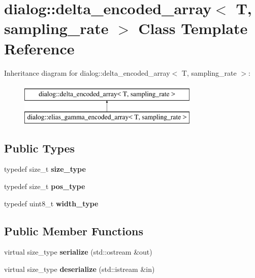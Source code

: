 \hypertarget{classdialog_1_1delta__encoded__array}{}\section{dialog\+:\+:delta\+\_\+encoded\+\_\+array$<$ T, sampling\+\_\+rate $>$ Class Template Reference}
\label{classdialog_1_1delta__encoded__array}
Inheritance diagram for dialog\+:\+:delta\+\_\+encoded\+\_\+array$<$ T, sampling\+\_\+rate $>$\+:\begin{figure}[H]
\begin{center}
\leavevmode
\includegraphics[height=2.000000cm]{classdialog_1_1delta__encoded__array}
\end{center}
\end{figure}
\subsection*{Public Types}
\begin{DoxyCompactItemize}
\item 
\mbox{\label{classdialog_1_1delta__encoded__array_a0cd3b42e267ec14eeb48f76bf3211c8f}} 
typedef size\+\_\+t {\bfseries size\+\_\+type}
\item 
\mbox{\label{classdialog_1_1delta__encoded__array_a9ed959d0d2070fa3044847cf4c3bbc12}} 
typedef size\+\_\+t {\bfseries pos\+\_\+type}
\item 
\mbox{\label{classdialog_1_1delta__encoded__array_aaa88ddf82d3790ea40350b14931c515e}} 
typedef uint8\+\_\+t {\bfseries width\+\_\+type}
\end{DoxyCompactItemize}
\subsection*{Public Member Functions}
\begin{DoxyCompactItemize}
\item 
\mbox{\label{classdialog_1_1delta__encoded__array_a533eeb8833bb554513c86eb7f1ce635f}} 
virtual size\+\_\+type {\bfseries serialize} (std\+::ostream \&out)
\item 
\mbox{\label{classdialog_1_1delta__encoded__array_aced4bc1f11a264fe3263b89be0e55d33}} 
virtual size\+\_\+type {\bfseries deserialize} (std\+::istream \&in)
\end{DoxyCompactItemize}
